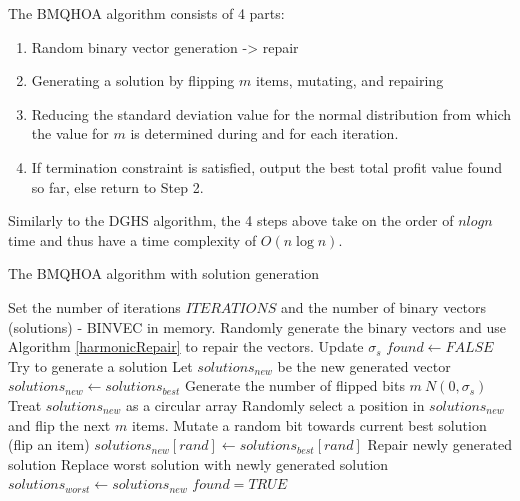\documentclass[titlepage]{article}
\begin{document}
The BMQHOA algorithm consists of 4 parts:
\begin{enumerate}
    \item Random binary vector generation -> repair
    \item Generating a solution by flipping $m$ items, mutating, and repairing
    \item Reducing the standard deviation value for the normal distribution from which the value for $m$ is determined during and for each iteration.
    \item If termination constraint is satisfied, output the best total profit value found so far, else return to Step 2.
\end{enumerate}

Similarly to the DGHS algorithm, the 4 steps above take on the order of $nlogn$ time and thus have a time complexity of ${O}(n\log{}n)$.

\begin{breakablealgorithm}
\caption{The BMQHOA algorithm with solution generation}\label{BMQHOA}
    \begin{algorithmic}[1]
        \State Set the number of iterations $ITERATIONS$ and the number of binary vectors (solutions) - BINVEC in memory.
        \State Randomly generate the binary vectors and use Algorithm \ref{harmonicRepair} to repair the vectors. 
            \State Update $\sigma_{s}$
            \State $found \gets FALSE$
                \State Try to generate a solution
                \State Let $solutions_{new}$ be the new generated vector 
                \State $solutions_{new} \gets solutions_{best}$
                \State Generate the number of flipped bits $m ~ N(0, \sigma_{s})$
                \State Treat $solutions_{new}$ as a circular array
                \State Randomly select a position in $solutions_{new}$ and flip the next $m$ items.
                \State Mutate a random bit towards current best solution (flip an item)
                \State $solutions_{new}[rand] \gets solutions_{best}[rand]$
                \State Repair newly generated solution
                    \State Replace worst solution with newly generated solution
                    \State $solutions_{worst} \gets solutions_{new}$
                    \State $found = TRUE$
                \EndIf
            \EndWhile
        \EndWhile
    \end{algorithmic}
\end{breakablealgorithm}
\vskip 0.5cm
\end{document}
